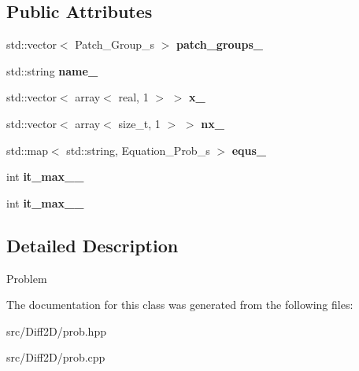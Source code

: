 \subsection*{Public Attributes}
\begin{DoxyCompactItemize}
\item 
\hypertarget{classProb_a63da8c35707c884a7f2960b18e8b5e30}{
std::vector$<$ Patch\_\-Group\_\-s $>$ {\bfseries patch\_\-groups\_\-}}
\label{classProb_a63da8c35707c884a7f2960b18e8b5e30}

\item 
\hypertarget{classProb_af34172c6eced00a603e92e0cf17e4953}{
std::string {\bfseries name\_\-}}
\label{classProb_af34172c6eced00a603e92e0cf17e4953}

\item 
\hypertarget{classProb_ac18ce288649f196b15137b88bfe374de}{
std::vector$<$ array$<$ real, 1 $>$ $>$ {\bfseries x\_\-}}
\label{classProb_ac18ce288649f196b15137b88bfe374de}

\item 
\hypertarget{classProb_a59f92ce7194950bf4c89d00af62c7b51}{
std::vector$<$ array$<$ size\_\-t, 1 $>$ $>$ {\bfseries nx\_\-}}
\label{classProb_a59f92ce7194950bf4c89d00af62c7b51}

\item 
\hypertarget{classProb_ac78ec4ce0542942cbfdb62e2737b149e}{
std::map$<$ std::string, Equation\_\-Prob\_\-s $>$ {\bfseries equs\_\-}}
\label{classProb_ac78ec4ce0542942cbfdb62e2737b149e}

\item 
\hypertarget{classProb_ab683dae1ead4955162ebe4a2194f8a35}{
int {\bfseries it\_\-max\_\_\-}}
\label{classProb_ab683dae1ead4955162ebe4a2194f8a35}

\item 
\hypertarget{classProb_ac344ce6492eb0d3f8b6655aa914982d7}{
int {\bfseries it\_\-max\_\_\-}}
\label{classProb_ac344ce6492eb0d3f8b6655aa914982d7}

\end{DoxyCompactItemize}


\subsection{Detailed Description}
Problem 

The documentation for this class was generated from the following files:\begin{DoxyCompactItemize}
\item 
src/Diff2D/prob.hpp\item 
src/Diff2D/prob.cpp\end{DoxyCompactItemize}
